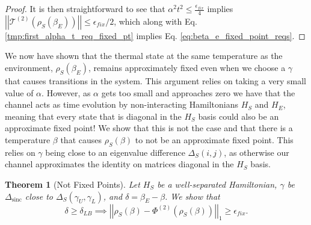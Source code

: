 \documentclass{article}
\newtheorem{theorem}{Theorem}
\newcommand{\norm}[1]{\left| \left| #1 \right| \right|}
\DeclareMathOperator{\sinc}{sinc}
\begin{document}
\begin{proof}
    It is then straightforward to see that $\alpha^2 t^2 \leq \frac{\epsilon_{fix}}{4}$ implies $\norm{\mathcal{T}^{(2)}(\rho_S(\beta_E))} \leq \epsilon_{fix} / 2$, which along with Eq. \eqref{tmp:first_alpha_t_req_fixed_pt} implies Eq. \eqref{eq:beta_e_fixed_point_reqs}. 
\end{proof}

We now have shown that the thermal state at the same temperature as the environment, $\rho_S(\beta_E)$, remains approximately fixed even when we choose a $\gamma$ that causes transitions in the system. This argument relies on taking a very small value of $\alpha$. However, as $\alpha$ gets too small and approaches zero we have that the channel acts as time evolution by non-interacting Hamiltonians $H_S$ and $H_E$, meaning that every state that is diagonal in the $H_S$ basis could also be an approximate fixed point! We show that this is not the case and that there is a temperature $\beta$ that causes $\rho_S(\beta)$ to not be an approximate fixed point. This relies on $\gamma$ being close to an eigenvalue difference $\Delta_S(i,j)$, as otherwise our channel approximates the identity on matrices diagonal in the $H_S$ basis. 
\begin{theorem}[Not Fixed Points] \label{thm:which_beta_not_fixed}
    Let $H_S$ be a well-separated Hamiltonian, $\gamma$ be $\Delta_{\sinc}$ close to $\Delta_S(\gamma_U, \gamma_L)$, and $\delta = \beta_E - \beta$. We show that
    \begin{equation}
        \delta \geq \delta_{LB} \implies \norm{\rho_S(\beta) - \Phi^{(2)}(\rho_S(\beta))}_1 \geq \epsilon_{fix}.
    \end{equation}
\end{theorem}
\end{document}
